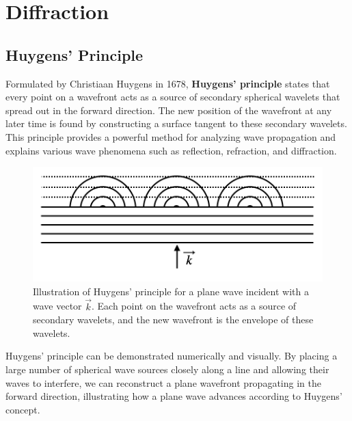\documentclass[
  a4paper,
]{book}
\begin{document}
\chapter{Diffraction}\label{diffraction}

\section{Huygens' Principle}\label{huygens-principle}

Formulated by Christiaan Huygens in 1678, \textbf{Huygens' principle}
states that every point on a wavefront acts as a source of secondary
spherical wavelets that spread out in the forward direction. The new
position of the wavefront at any later time is found by constructing a
surface tangent to these secondary wavelets. This principle provides a
powerful method for analyzing wave propagation and explains various wave
phenomena such as reflection, refraction, and diffraction.

\begin{figure}[H]

{\centering \includegraphics[width=0.4\linewidth,height=\textheight,keepaspectratio]{wave-optics/img/huygens.png}

}

\caption{Illustration of Huygens' principle for a plane wave incident
with a wave vector \(\vec{k}\). Each point on the wavefront acts as a
source of secondary wavelets, and the new wavefront is the envelope of
these wavelets.}

\end{figure}%

Huygens' principle can be demonstrated numerically and visually. By
placing a large number of spherical wave sources closely along a line
and allowing their waves to interfere, we can reconstruct a plane
wavefront propagating in the forward direction, illustrating how a plane
wave advances according to Huygens' concept.
\end{document}
